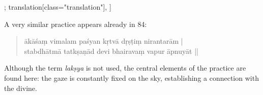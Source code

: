 \begin{alignment}[
  texts=edition[class="edition"];
  translation[class="translation"],
  ]
\begin{translation}
\begin{tlate}
{\begin{quote}
\end{quote}
A very similar practice appears already in  84:
      \begin{quote}
ākāśaṃ vimalam paśyan kṛtvā dṛṣṭiṃ nirantarām |  \\
stabdhātmā tatkṣaṇād devi bhairavaṃ vapur āpnuyāt ||
\end{quote}
Although the term \textit{lakṣya} is not used, the central elements of the practice are found here: the gaze is constantly fixed on the sky, establishing a connection with the divine.} \vspace*{\fill} 
  \end{tlate}
  \end{translation}
  \ekdpb*{}
\end{alignment}
